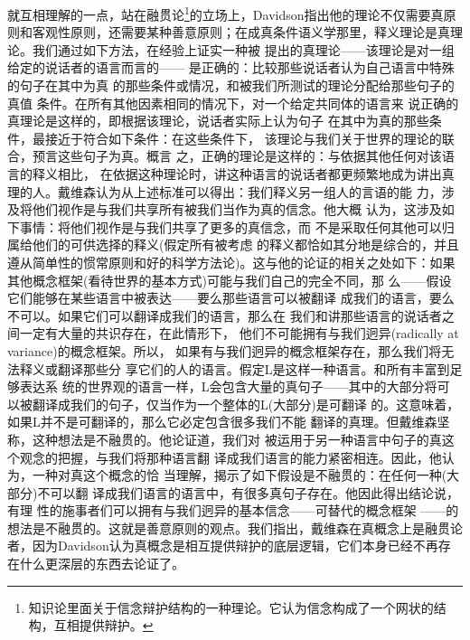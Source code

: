 \documentclass{article}
\begin{document}
{就互相理解的一点，站在融贯论\footnote{知识论里面关于信念辩护结构的一种理论。它认为信念构成了一个网状的结构，互相提供辩护。}的立场上，Davidson指出他的理论不仅需要真原则和客观性原则，还需要某种善意原则；在成真条件语义学那里，释义理论是真理论。我们通过如下方法，在经验上证实一种被 提出的真理论——该理论是对一组给定的说话者的语言而言的—— 是正确的：比较那些说话者认为自己语言中特殊的句子在其中为真 的那些条件或情况，和被我们所测试的理论分配给那些句子的真值 条件。在所有其他因素相同的情况下，对一个给定共同体的语言来 说正确的真理论是这样的，即根据该理论，说话者实际上认为句子 在其中为真的那些条件，最接近于符合如下条件：在这些条件下， 该理论与我们关于世界的理论的联合，预言这些句子为真。概言 之，正确的理论是这样的：与依据其他任何对该语言的释义相比， 在依据这种理论时，讲这种语言的说话者都更频繁地成为讲出真理的人。戴维森认为从上述标准可以得出：我们释义另一组人的言语的能 力，涉及将他们视作是与我们共享所有被我们当作为真的信念。他大概 认为，这涉及如下事情：将他们视作是与我们共享了更多的真信念，而 不是采取任何其他可以归属给他们的可供选择的释义(假定所有被考虑 的释义都恰如其分地是综合的，并且遵从简单性的惯常原则和好的科学方法论)。这与他的论证的相关之处如下：如果 其他概念框架(看待世界的基本方式)可能与我们自己的完全不同，那 么——假设它们能够在某些语言中被表达——要么那些语言可以被翻译 成我们的语言，要么不可以。如果它们可以翻译成我们的语言，那么在 我们和讲那些语言的说话者之间一定有大量的共识存在，在此情形下， 他们不可能拥有与我们迥异(radically at variance)的概念框架。所以， 如果有与我们迥异的概念框架存在，那么我们将无法释义或翻译那些分 享它们的人的语言。假定L是这样一种语言。和所有丰富到足够表达系 统的世界观的语言一样，L会包含大量的真句子——其中的大部分将可 以被翻译成我们的句子，仅当作为一个整体的L(大部分)是可翻译 的。这意味着，如果L并不是可翻译的，那么它必定包含很多我们不能 翻译的真理。但戴维森坚称，这种想法是不融贯的。他论证道，我们对 被运用于另一种语言中句子的真这个观念的把握，与我们将那种语言翻 译成我们语言的能力紧密相连。因此，他认为，一种对真这个概念的恰 当理解，揭示了如下假设是不融贯的：在任何一种(大部分)不可以翻 译成我们语言的语言中，有很多真句子存在。他因此得出结论说，有理 性的施事者们可以拥有与我们迥异的基本信念——可替代的概念框架 ——的想法是不融贯的。这就是善意原则的观点。我们指出，戴维森在真概念上是融贯论者，因为Davidson认为真概念是相互提供辩护的底层逻辑，它们本身已经不再存在什么更深层的东西去论证了。
}
\end{document}

